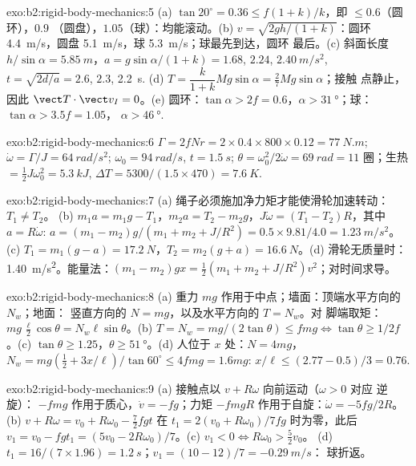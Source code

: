 \begin{solution}{exo:b2:rigid-body-mechanics:5}
(a) $\tan20^\circ = 0.36 \le f(1 + k)/k$，即 $\le 0.6$（圆环），$0.9$
（圆盘），$1.05$（球）：均能滚动。(b) $v = \sqrt{2gh/(1 + k)}$：圆环
\qty{4.4}{m/s}，圆盘 \qty{5.1}{m/s}，球 \qty{5.3}{m/s}；球最先到达，圆环
最后。(c) 斜面长度 $h/\sin\alpha = \qty{5.85}{m}$，$a = g\sin\alpha/(1 + k) =
1.68$, $2.24$, $\qty{2.40}{m/s^2}$, $t = \sqrt{2d/a} = 2.6$, $2.3$, \qty{2.2}{s}.
(d) $T = \dfrac{k}{1 + k}Mg\sin\alpha = \tfrac27Mg\sin\alpha$；接触
点静止，因此 $\vect T\cdot\vect v_I = 0$。(e) 圆环：$\tan\alpha >
2f = 0.6$，$\alpha > \qty{31}{\degree}$；球：$\tan\alpha > 3.5f = 1.05$，
$\alpha > \qty{46}{\degree}$.
\end{solution}

\begin{solution}{exo:b2:rigid-body-mechanics:6}
$\Gamma = 2fNr = 2 \times 0.4 \times 800 \times 0.12 = \qty{77}{N.m}$; $\dot\omega =
\Gamma/J = \qty{64}{rad/s^2}$; $\omega_0 = \qty{94}{rad/s}$, $t = \qty{1.5}{s}$;
$\theta = \omega_0^2/2\dot\omega = \qty{69}{rad} = 11$ 圈；生热 $= \tfrac12J
\omega_0^2 = \qty{5.3}{kJ}$, $\Delta T = 5300/(1.5 \times 470) = \qty{7.6}{K}$.
\end{solution}

\begin{solution}{exo:b2:rigid-body-mechanics:7}
(a) 绳子必须施加净力矩才能使滑轮加速转动：$T_1 \ne T_2$。
(b) $m_1a = m_1g - T_1$，$m_2a = T_2 - m_2g$，$J\dot\omega = (T_1 - T_2)R$，其中
$a = R\dot\omega$: $a = (m_1 - m_2)g/(m_1 + m_2 + J/R^2) = 0.5 \times 9.81/4.0 =
\qty{1.23}{m/s^2}$。(c) $T_1 = m_1(g - a) = \qty{17.2}{N}$，$T_2 = m_2(g + a) =
\qty{16.6}{N}$。(d) 滑轮无质量时：\qty{1.40}{m/s^2}。能量法：$(m_1 - m_2)gx =
\tfrac12(m_1 + m_2 + J/R^2)v^2$；对时间求导。
\end{solution}

\begin{solution}{exo:b2:rigid-body-mechanics:8}
(a) 重力 $mg$ 作用于中点；墙面：顶端水平方向的 $N_w$；地面：
竖直方向的 $N = mg$，以及水平方向的 $T = N_w$。对
脚端取矩：$mg\,\tfrac{\ell}2\cos\theta = N_w\ell\sin\theta$。(b) $T = N_w =
mg/(2\tan\theta) \le fmg \iff \tan\theta \ge 1/2f$。(c) $\tan\theta \ge
1.25$，$\theta \ge \qty{51}{\degree}$。(d) 人位于 $x$ 处：$N = 4mg$，$N_w =
mg(\tfrac12 + 3x/\ell)/\tan60^\circ \le 4fmg = 1.6mg$: $x/\ell \le (2.77 -
0.5)/3 = 0.76$.
\end{solution}

\begin{solution}{exo:b2:rigid-body-mechanics:9}
(a) 接触点以 $v + R\omega$ 向前运动（$\omega > 0$ 对应
逆旋）： $-fmg$ 作用于质心，$\dot v = -fg$；力矩
$-fmgR$ 作用于自旋：$\dot\omega = -5fg/2R$。(b)  $v + R\omega = v_0 +
R\omega_0 - \tfrac72fgt$ 在 $t_1 = 2(v_0 + R\omega_0)/7fg$ 时为零，此后 $v_1
= v_0 - fgt_1 = (5v_0 - 2R\omega_0)/7$。(c) $v_1 < 0 \iff R\omega_0 > \tfrac52v_0$。
(d) $t_1 = 16/(7 \times 1.96) = \qty{1.2}{s}$；$v_1 = (10 - 12)/7 = \qty{-0.29}{m/s}$：
球折返。
\end{solution}

